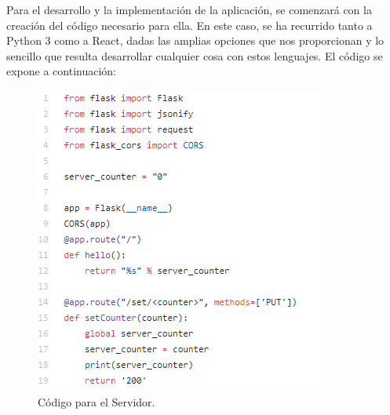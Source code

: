 \documentclass[10pt]{article}
\begin{document}
Para el desarrollo y la implementación de la aplicación, se comenzará con la
creación del código necesario para ella. En este caso, se ha recurrido tanto a
Python 3 como a React, dadas las amplias opciones que nos proporcionan y lo
sencillo que resulta desarrollar cualquier cosa con estos lenguajes. El código se
expone a continuación:

\begin{figure}[h!]
 \includegraphics[width=\linewidth]{./Web/Azure/CodigoServer.png}
 \caption{Código para el Servidor.}
\end{figure}
\end{document}
